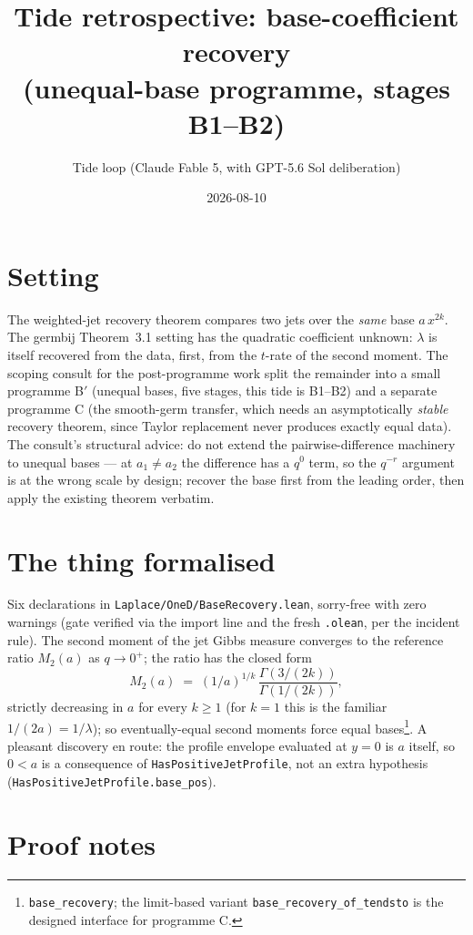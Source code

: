 \documentclass[11pt]{article}
\title{Tide retrospective: base-coefficient recovery\\
(unequal-base programme, stages B1--B2)}
\author{Tide loop (Claude Fable 5, with GPT-5.6 Sol deliberation)}
\date{2026-08-10}
\begin{document}
\maketitle

\section{Setting}

The weighted-jet recovery theorem compares two jets over the
\emph{same} base $a\,x^{2k}$. The germbij Theorem~3.1 setting has the
quadratic coefficient unknown: $\lambda$ is itself recovered from the
data, first, from the $t$-rate of the second moment. The scoping
consult for the post-programme work split the remainder into a small
programme B$'$ (unequal bases, five stages, this tide is B1--B2) and
a separate programme C (the smooth-germ transfer, which needs an
asymptotically \emph{stable} recovery theorem, since Taylor
replacement never produces exactly equal data). The consult's
structural advice: do not extend the pairwise-difference machinery to
unequal bases --- at $a_1 \ne a_2$ the difference has a $q^0$ term,
so the $q^{-r}$ argument is at the wrong scale by design; recover the
base first from the leading order, then apply the existing theorem
verbatim.

\section{The thing formalised}

Six declarations in \texttt{Laplace/OneD/BaseRecovery.lean},
sorry-free with zero warnings (gate verified via the import line and
the fresh \texttt{.olean}, per the incident rule). The second moment
of the jet Gibbs measure converges to the reference ratio
$M_2(a)$ as $q \to 0^+$; the ratio has the closed form
\[
M_2(a) \;=\; (1/a)^{1/k}\,
\frac{\Gamma(3/(2k))}{\Gamma(1/(2k))},
\]
strictly decreasing in $a$ for every $k \ge 1$ (for $k = 1$ this is
the familiar $1/(2a) = 1/\lambda$); so eventually-equal second
moments force equal
bases\footnote{\texttt{base\_recovery}; the limit-based variant
\texttt{base\_recovery\_of\_tendsto} is the designed interface for
programme C.}. A pleasant discovery en route: the profile envelope
evaluated at $y = 0$ is $a$ itself, so $0 < a$ is a consequence of
\texttt{HasPositiveJetProfile}, not an extra hypothesis
(\texttt{HasPositiveJetProfile.base\_pos}).

\section{Proof notes}
\end{document}
